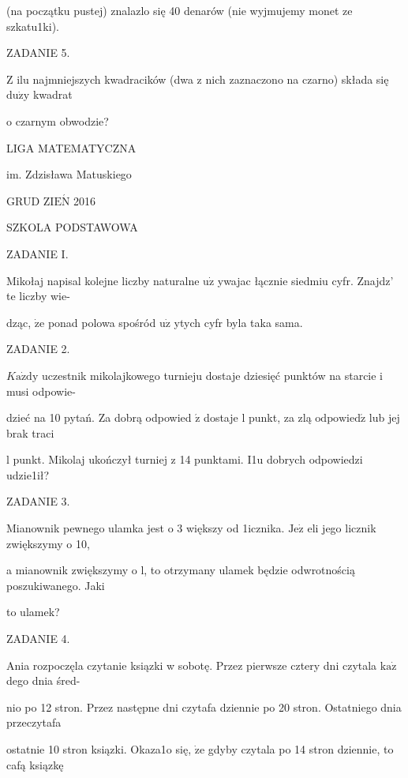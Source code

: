 \documentclass[a4paper,12pt]{article}
\begin{document}
(na początku pustej) znalazlo się 40 denarów (nie wyjmujemy monet ze szkatu1ki).

ZADANIE 5.

$\mathrm{Z}$ ilu najmniejszych kwadracików (dwa z nich zaznaczono na czarno) składa się $\mathrm{d}\mathrm{u}\dot{\mathrm{z}}\mathrm{y}$ kwadrat

o czarnym obwodzie?






LIGA MATEMATYCZNA

im. Zdzisława Matuskiego

GRUD Z$\mathrm{I}\mathrm{E}\acute{\mathrm{N}}$ 2016

SZKOLA PODSTAWOWA

ZADANIE I.

Mikołaj napisal kolejne liczby naturalne $\mathrm{u}\dot{\mathrm{z}}$ ywajac łącznie siedmiu cyfr. Znajdz' te liczby wie-

dząc, $\dot{\mathrm{z}}\mathrm{e}$ ponad polowa spośród $\mathrm{u}\dot{\mathrm{z}}$ ytych cyfr byla taka sama.

ZADANIE 2.

$K\mathrm{a}\dot{\mathrm{z}}\mathrm{d}\mathrm{y}$ uczestnik mikolajkowego turnieju dostaje dziesięć punktów na starcie i musi odpowie-

dzieć na 10 pytań. Za dobrą odpowied $\acute{\mathrm{z}}$ dostaje l punkt, za zlą $\mathrm{o}\mathrm{d}\mathrm{p}\mathrm{o}\mathrm{w}\mathrm{i}\mathrm{e}\mathrm{d}\acute{\mathrm{z}}$ lub jej brak traci

l punkt. Mikolaj ukończył turniej z 14 punktami. I1u dobrych odpowiedzi udzie1ił?

ZADANIE 3.

Mianownik pewnego ulamka jest o 3 większy od 1icznika. $\mathrm{J}\mathrm{e}\dot{\mathrm{z}}$ eli jego licznik zwiększymy o 10,

a mianownik zwiększymy o l, to otrzymany ulamek będzie odwrotnością poszukiwanego. Jaki

to ulamek?

ZADANIE 4.

Ania rozpoczęla czytanie ksiązki w sobotę. Przez pierwsze cztery dni czytala $\mathrm{k}\mathrm{a}\dot{\mathrm{z}}$ dego dnia śred-

nio po 12 stron. Przez następne dni czytafa dziennie po 20 stron. Ostatniego dnia przeczytafa

ostatnie 10 stron ksiązki. Okaza1o się, $\dot{\mathrm{z}}\mathrm{e}$ gdyby czytala po 14 stron dziennie, to cafą ksiązkę
\end{document}
